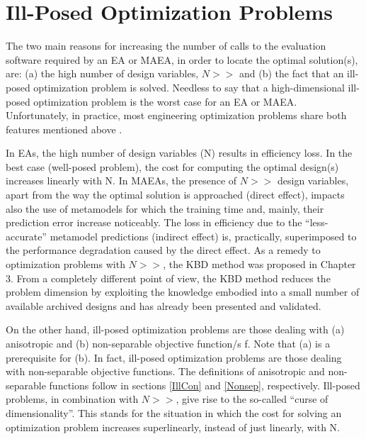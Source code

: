 



 

\section{Ill-Posed Optimization Problems}
\label{illpost}
The two main reasons for increasing the number of calls to the evaluation software  required by an EA or MAEA, in order to locate the optimal solution(s), are: (a) the high number of design variables, $N\!>>$ and (b) the fact that an ill-posed optimization problem is solved. Needless to say that a high-dimensional ill-posed optimization problem is the worst case for an EA or MAEA.  Unfortunately, in practice, most engineering optimization problems share both features mentioned above . 

In EAs, the high number of design variables (N) results in efficiency loss. In the best case (well-posed problem), the cost for computing the optimal design(s) increases linearly with N. In MAEAs, the presence of $N\!>>$ design variables, apart from the way the optimal solution is approached (direct effect), impacts also the use of metamodels for which the training time and, mainly, their  prediction error increase noticeably. The loss in efficiency due to the ``less-accurate'' metamodel predictions (indirect effect) is, practically, superimposed to the performance degradation caused by the direct effect.  As a remedy to optimization problems with $N\!>>$, the KBD method was proposed in Chapter 3. From a completely different point of view, the KBD method reduces the problem dimension by exploiting the knowledge embodied into a small number of available archived designs and has already been presented and validated.             

On the other hand, ill-posed optimization problems are those dealing with (a) anisotropic and (b)  non-separable objective function/s f. Note that (a) is a prerequisite for (b). In fact, ill-posed optimization problems are those dealing with non-separable objective functions. The definitions of anisotropic and non-separable functions follow in sections \ref{IllCon} and \ref{Nonsep}, respectively. Ill-posed problems, in combination with $N\!>>$, give rise to the so-called ``curse of dimensionality''. This stands for the situation in which the cost for solving an optimization problem increases superlinearly, instead of just linearly, with N. 


